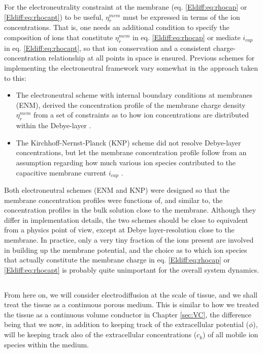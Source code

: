 For the electroneutrality constraint at the membrane (eq. \ref{Eldiff:eq:rhocap} or \ref{Eldiff:eq:rhocapt}) to be useful, $\eta_{r}^{mem}$ must be expressed in terms of the ion concentrations. That is, one needs an additional condition to specify the composition of ions that constitute $\eta_{r}^{mem}$ in eq. \ref{Eldiff:eq:rhocap} or mediate $i_{cap}$ in eq. \ref{Eldiff:eq:rhocapt}, so that ion conservation and a consistent charge-concentration relationship  at all points in space is ensured. Previous schemes for implementing the electroneutral framework vary somewhat in the approach taken to this:

\begin{itemize}
\item The electroneutral scheme with internal boundary conditions at membranes (ENM), derived the concentration profile of the membrane charge density $\eta_{r}^{mem}$ from a set of constraints as to how ion concentrations are distributed within the Debye-layer \citep{Mori2006, Mori2009, Pods2017}.

\item The Kirchhoff-Nernst-Planck (KNP) scheme did not resolve Debye-layer concentrations, but let the membrane concentration profile follow from an assumption regarding how much various ion species contributed to the capacitive membrane current $i_{cap}$ \citep{ellingsrud2020}.
\end{itemize}

Both electroneutral schemes (ENM and KNP) were designed so that the membrane concentration profiles were functions of, and similar to, the concentration profiles in the bulk solution close to the membrane. Although they differ in implementation details, the two schemes should be close to equivalent from a physics point of view, except at Debye layer-resolution close to the membrane.  In practice, only a very tiny fraction of the ions present are involved in building up the membrane potential, and the choice as to which ion species that actually constitute the membrane charge in eq. \ref{Eldiff:eq:rhocap} or \ref{Eldiff:eq:rhocapt} is probably quite unimportant for the overall system dynamics.


\subsection{}
\label{sec:Eldiff:porous}
From here on, we will consider electrodiffusion at the scale of tissue, and we shall treat the tissue as a continuous porous medium. This is similar to how we treated the tissue as a continuous volume conductor in Chapter \ref{sec:VC}, the difference being that we now, in addition to keeping track of the extracellular potential ($\phi$), will be keeping track also of the extracellular concentrations ($c_k$) of all mobile ion species within the medium. 

